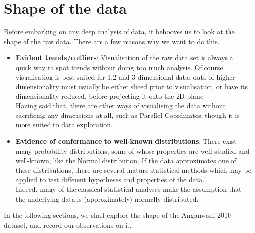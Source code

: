 \documentclass[10pt]{article}
\begin{document}
\section{Shape of the data}
Before embarking on any deep analysis of data, it behooves us to look at the shape of the raw data. There are a few reasons why we want to do this.\\
\begin{itemize}
\item \textbf{Evident trends/outliers}: Visualisation of the raw data set is always a quick way to spot trends without doing too much analysis. Of course, visualisation is best suited for 1,2 and 3-dimensional data: data of higher dimensionality must usually be either sliced prior to visualisation, or have its dimensionality reduced, before projecting it onto the 2D plane.\\
Having said that, there are other ways of visualising the data without sacrificing any dimensions at all, such as Parallel Coordinates, though it is more suited to data exploration.
\item \textbf{Evidence of conformance to well-known distributions}: There exist many probability distributions, some of whose properties are well-studied and well-known, like the Normal distribution. If the data approximates one of these distributions, there are several mature statistical methods which may be applied to test different hypotheses and properties of the data.\\
Indeed, many of the classical statistical analyses make the assumption that the underlying data is (approximately) normally distributed.
\end{itemize}

In the following sections, we shall explore the shape of the Anganwadi 2010 dataset, and record our observations on it.

\newpage
\end{document}
